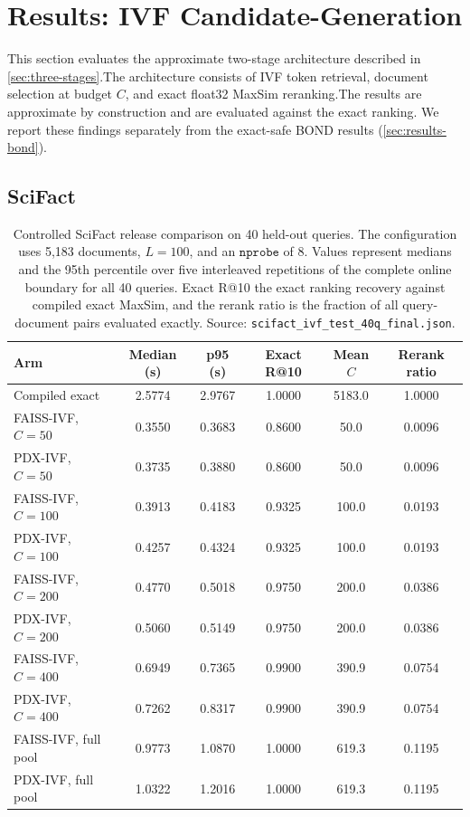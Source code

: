 \section{Results: IVF Candidate-Generation}
\label{sec:results-ivf}

This section evaluates the approximate two-stage architecture described in
\cref{sec:three-stages}.The architecture consists of IVF token retrieval, 
document selection at budget $C$, and exact float32 MaxSim reranking.The 
results are approximate by construction and are evaluated against the 
exact ranking. We report these findings separately from the exact-safe 
BOND results (\cref{sec:results-bond}).

\subsection{SciFact}
\label{sec:ivf-scifact}

\begin{table}[t!]
  \centering
  \caption{Controlled SciFact release comparison on 40 held-out queries.
    The configuration uses 5,183 documents, $L=100$, and an $\texttt{nprobe}$ 
    of 8. Values represent medians and the 95th percentile over five interleaved 
    repetitions of the complete online boundary for all 40 queries. Exact R@10 
    the exact ranking recovery against compiled exact MaxSim, and the rerank 
    ratio is the fraction of all query-document pairs evaluated exactly.
    Source: \texttt{scifact\_ivf\_test\_40q\_final.json}.}
  \label{tab:scifact-ivf}
  \footnotesize
  \begin{tabular}{@{}l S[table-format=1.4] S[table-format=1.4] S[table-format=1.4] S[table-format=4.1] S[table-format=1.4]@{}}
    \toprule
    Arm & {Median (\si{\second})} & {p95 (\si{\second})} & {Exact R@10} & {Mean $C$} & {Rerank ratio} \\
    \midrule
    Compiled exact      & 2.5774 & 2.9767 & 1.0000 & 5183.0 & 1.0000 \\
    \midrule
    FAISS-IVF, $C{=}50$   & 0.3550 & 0.3683 & 0.8600 &   50.0 & 0.0096 \\
    PDX-IVF,   $C{=}50$   & 0.3735 & 0.3880 & 0.8600 &   50.0 & 0.0096 \\
    FAISS-IVF, $C{=}100$  & 0.3913 & 0.4183 & 0.9325 &  100.0 & 0.0193 \\
    PDX-IVF,   $C{=}100$  & 0.4257 & 0.4324 & 0.9325 &  100.0 & 0.0193 \\
    FAISS-IVF, $C{=}200$  & 0.4770 & 0.5018 & 0.9750 &  200.0 & 0.0386 \\
    PDX-IVF,   $C{=}200$  & 0.5060 & 0.5149 & 0.9750 &  200.0 & 0.0386 \\
    FAISS-IVF, $C{=}400$  & 0.6949 & 0.7365 & 0.9900 &  390.9 & 0.0754 \\
    PDX-IVF,   $C{=}400$  & 0.7262 & 0.8317 & 0.9900 &  390.9 & 0.0754 \\
    FAISS-IVF, full pool  & 0.9773 & 1.0870 & 1.0000 &  619.3 & 0.1195 \\
    PDX-IVF,   full pool  & 1.0322 & 1.2016 & 1.0000 &  619.3 & 0.1195 \\
    \bottomrule
  \end{tabular}
\end{table}


